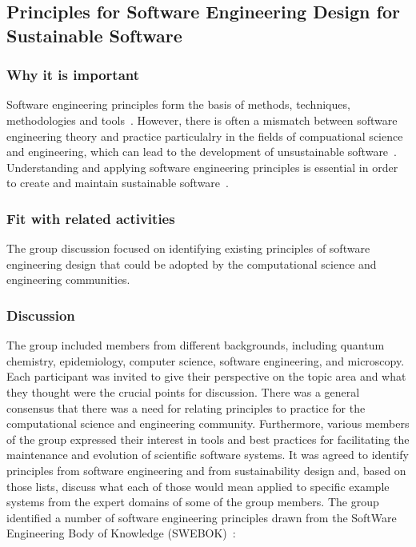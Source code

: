 \subsection{Principles for Software Engineering Design for Sustainable Software} 

\subsubsection{Why it is important}

Software engineering principles form the basis of methods, techniques, methodologies and tools~\cite{}. However, there is often a mismatch between software engineering theory and practice particulalry in the fields of compuational science and engineering, which can lead to the development of unsustainable software~\cite{}. Understanding and applying software engineering principles is essential in order to create and maintain sustainable software~\cite{}.

\subsubsection{Fit with related activities}
The group discussion focused on identifying existing principles of software engineering design that could be adopted by the computational science and engineering communities.

\subsubsection{Discussion}

The group included members from different backgrounds, including quantum chemistry, epidemiology, computer science, software engineering, and microscopy. Each participant was invited to give their perspective on the topic area and what they thought were the crucial points for discussion. There was a general consensus that there was a need for relating principles to practice for the computational science and engineering community. Furthermore, various members of the group expressed their interest in tools and best practices for facilitating the maintenance and evolution of scientific software systems. It was agreed to identify principles from software engineering and from sustainability design and, based on those lists, discuss what each of those would mean applied to specific example systems from the expert domains of some of the group members. The group identified a number of software engineering principles drawn from the SoftWare Engineering Body of Knowledge (SWEBOK)~\cite{swebokv3}:

